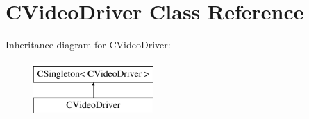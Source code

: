 \hypertarget{class_c_video_driver}{
\section{CVideoDriver Class Reference}
\label{class_c_video_driver}
}
Inheritance diagram for CVideoDriver:\begin{figure}[H]
\begin{center}
\leavevmode
\includegraphics[height=2cm]{class_c_video_driver}
\end{center}
\end{figure}

